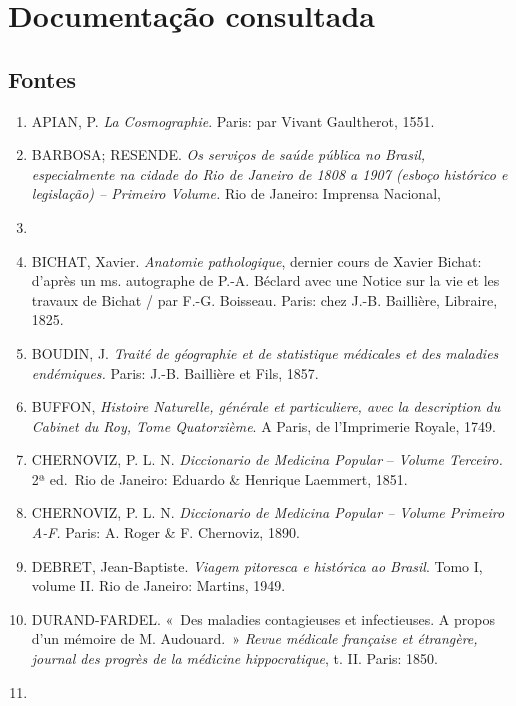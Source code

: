 \hypertarget{documentauxe7uxe3o-consultada}{%
\chapter{Documentação consultada}\label{documentauxe7uxe3o-consultada}}

\hypertarget{fontes}{%
\section{Fontes}\label{fontes}}

\begin{enumerate}
\def\labelenumi{\arabic{enumi}.}
\item
  APIAN, P. \emph{La Cosmographie}. Paris: par Vivant Gaultherot, 1551.
\item
  BARBOSA; RESENDE. \emph{Os serviços de saúde pública no Brasil,
  especialmente na cidade do Rio de Janeiro de 1808 a 1907 (esboço
  histórico e legislação) -- Primeiro Volume.} Rio de Janeiro: Imprensa
  Nacional,
\item
\item
  BICHAT, Xavier. \emph{Anatomie pathologique}, dernier cours de Xavier
  Bichat: d'après un ms. autographe de P.-A. Béclard avec une Notice sur
  la vie et les travaux de Bichat / par F.-G. Boisseau. Paris: chez
  J.-B. Baillière, Libraire, 1825.
\item
  BOUDIN, J. \emph{Traité de géographie et de statistique médicales et
  des maladies endémiques.} Paris: J.-B. Baillière et Fils, 1857.
\item
  BUFFON, \emph{Histoire Naturelle, générale et particuliere, avec la
  description du Cabinet du Roy, Tome Quatorzième}. A Paris, de
  l'Imprimerie Royale, 1749.
\item
  CHERNOVIZ, P. L. N. \emph{Diccionario de Medicina Popular} --
  \emph{Volume Terceiro.} 2ª ed.~Rio de Janeiro: Eduardo \& Henrique
  Laemmert, 1851.
\item
  CHERNOVIZ, P. L. N. \emph{Diccionario de Medicina Popular -- Volume
  Primeiro A-F.} Paris: A. Roger \& F. Chernoviz, 1890.
\item
  DEBRET, Jean-Baptiste. \emph{Viagem pitoresca e histórica ao Brasil}.
  Tomo I, volume II. Rio de Janeiro: Martins, 1949.
\item
  DURAND-FARDEL. «~Des maladies contagieuses et infectieuses. A propos
  d'un mémoire de M. Audouard.~» \emph{Revue médicale française et
  étrangère, journal des progrès de la médicine hippocratique}, t. II.
  Paris: 1850.
\item

\end{enumerate}
